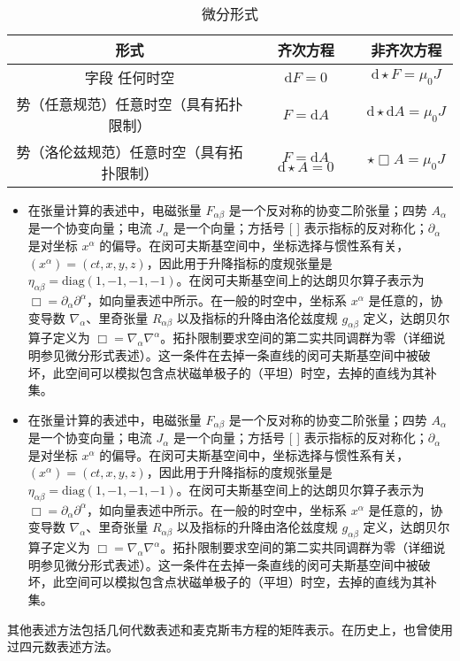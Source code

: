 \begin{table}[ht]
\centering
\caption{微分形式}\label{MAXS4}
\begin{tabular}{|c|c|c|}
\hline \textbf{形式} & \textbf{齐次方程} & \textbf{非齐次方程} \\
\hline 字段 任何时空 & \( \mathrm{d} F = 0 \) & \( \mathrm{d} \star F = \mu_0 J \)\\
\hline 势（任意规范）任意时空（具有拓扑限制）& \( F = \mathrm{d} A \) & \( \mathrm{d} \star \mathrm{d} A = \mu_{0} J \)\\
\hline 势（洛伦兹规范）任意时空（具有拓扑限制）& \( F = \mathrm{d} A \)\( \mathrm{d} \star A = 0 \)& \( \star \Box A = \mu_{0} J \)\\
\hline 
\end{tabular}
\end{table}
\begin{itemize}
\item 在张量计算的表述中，电磁张量 \( F_{\alpha \beta} \) 是一个反对称的协变二阶张量；四势 \( A_{\alpha} \) 是一个协变向量；电流 \( J_{\alpha} \) 是一个向量；方括号 [ ] 表示指标的反对称化；\( \partial_{\alpha} \) 是对坐标 \( x^{\alpha} \) 的偏导。在闵可夫斯基空间中，坐标选择与惯性系有关，\( (x^{\alpha}) = (ct, x, y, z) \)，因此用于升降指标的度规张量是 \( \eta_{\alpha \beta} = \text{diag}(1, -1, -1, -1) \)。在闵可夫斯基空间上的达朗贝尔算子表示为 \( \Box = \partial_{\alpha} \partial^{\alpha} \)，如向量表述中所示。在一般的时空中，坐标系 \( x^{\alpha} \) 是任意的，协变导数 \( \nabla_{\alpha} \)、里奇张量 \( R_{\alpha \beta} \) 以及指标的升降由洛伦兹度规 \( g_{\alpha \beta} \) 定义，达朗贝尔算子定义为 \( \Box = \nabla_{\alpha} \nabla^{\alpha} \)。拓扑限制要求空间的第二实共同调群为零（详细说明参见微分形式表述）。这一条件在去掉一条直线的闵可夫斯基空间中被破坏，此空间可以模拟包含点状磁单极子的（平坦）时空，去掉的直线为其补集。
\item 在张量计算的表述中，电磁张量 \( F_{\alpha \beta} \) 是一个反对称的协变二阶张量；四势 \( A_{\alpha} \) 是一个协变向量；电流 \( J_{\alpha} \) 是一个向量；方括号 [ ] 表示指标的反对称化；\( \partial_{\alpha} \) 是对坐标 \( x^{\alpha} \) 的偏导。在闵可夫斯基空间中，坐标选择与惯性系有关，\( (x^{\alpha}) = (ct, x, y, z) \)，因此用于升降指标的度规张量是 \( \eta_{\alpha \beta} = \text{diag}(1, -1, -1, -1) \)。在闵可夫斯基空间上的达朗贝尔算子表示为 \( \Box = \partial_{\alpha} \partial^{\alpha} \)，如向量表述中所示。在一般的时空中，坐标系 \( x^{\alpha} \) 是任意的，协变导数 \( \nabla_{\alpha} \)、里奇张量 \( R_{\alpha \beta} \) 以及指标的升降由洛伦兹度规 \( g_{\alpha \beta} \) 定义，达朗贝尔算子定义为 \( \Box = \nabla_{\alpha} \nabla^{\alpha} \)。拓扑限制要求空间的第二实共同调群为零（详细说明参见微分形式表述）。这一条件在去掉一条直线的闵可夫斯基空间中被破坏，此空间可以模拟包含点状磁单极子的（平坦）时空，去掉的直线为其补集。
\end{itemize}
其他表述方法包括几何代数表述和麦克斯韦方程的矩阵表示。在历史上，也曾使用过四元数表述方法。

